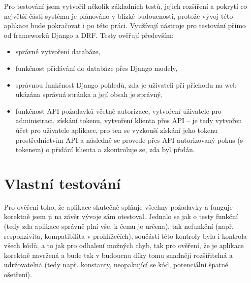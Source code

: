     Pro testování jsem vytvořil několik základních testů, jejich rozšíření a pokrytí co největší části systému je plánováno v blízké budoucnosti, protože vývoj této aplikace bude pokračovat i po této práci. Využívají nástroje pro testování přímo od frameworků Django a DRF. Testy ověřují především:
        \begin{itemize}
            \item správné vytvoření databáze,
            \item funkčnost přidávání do databáze přes Django modely,
            \item správnou funkčnost Django pohledů, zda je uživateli při příchodu na web ukázána správná stránka a její obsah je správný,
            \item funkčnost API požadavků včetně autorizace, vytvoření uživatele pro administraci, získání tokenu, vytvoření klienta přes API -- je tedy vytvořen účet pro uživatele aplikace, pro ten se vyzkouší získání jeho tokenu prostřednictvím API a následně se provede přes API autorizovaný pokus (s tokenem) o přidání klienta a zkontroluje se, zda byl přidán.
        \end{itemize}

    \section{Vlastní testování}
    Pro ověření toho, že aplikace skutečně splňuje všechny požadavky a funguje korektně jsem ji na závěr vývoje sám otestoval. Jednalo se jak o testy funkční (tedy zda aplikace správně plní vše, k čemu je určena), tak nefunkční (např. responzivita, kompatibilita v prohlížečích), součástí této kontroly byla i kontrola všech kódů, a to jak pro odhalení možných chyb, tak pro ověření, že je aplikace korektně navržená a bude tak v budoucnu díky tomu snadněji rozšířitelná a udržovatelná (tedy např. konstanty, neopakující se kód, potenciální špatné ošetření).
    
